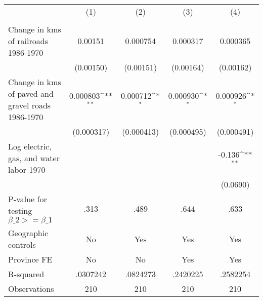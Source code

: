 {
\def\sym#1{\ifmmode^{#1}\else\(^{#1}\)\fi}
\begin{tabular}{l*{4}{c}}
\hline\hline
                &\multicolumn{1}{c}{(1)}&\multicolumn{1}{c}{(2)}&\multicolumn{1}{c}{(3)}&\multicolumn{1}{c}{(4)}\\
                &\multicolumn{1}{c}{}&\multicolumn{1}{c}{}&\multicolumn{1}{c}{}&\multicolumn{1}{c}{}\\
\hline
Change in kms of railroads 1986-1970&  0.00151         & 0.000754         & 0.000317         & 0.000365         \\
                &(0.00150)         &(0.00151)         &(0.00164)         &(0.00162)         \\
[1em]
Change in kms of paved and gravel roads 1986-1970& 0.000803\sym{**} & 0.000712\sym{*}  & 0.000930\sym{*}  & 0.000926\sym{*}  \\
                &(0.000317)         &(0.000413)         &(0.000495)         &(0.000491)         \\
[1em]
Log electric, gas, and water labor 1970&                  &                  &                  &   -0.136\sym{**} \\
                &                  &                  &                  & (0.0690)         \\
\hline
P-value for testing $\beta\_{2} >= \beta\_{1}$&     .313         &     .489         &     .644         &     .633         \\
Geographic controls&       No         &      Yes         &      Yes         &      Yes         \\
Province FE     &       No         &       No         &      Yes         &      Yes         \\
R-squared       & .0307242         & .0824273         & .2420225         & .2582254         \\
Observations    &      210         &      210         &      210         &      210         \\
\hline\hline
\end{tabular}
}
